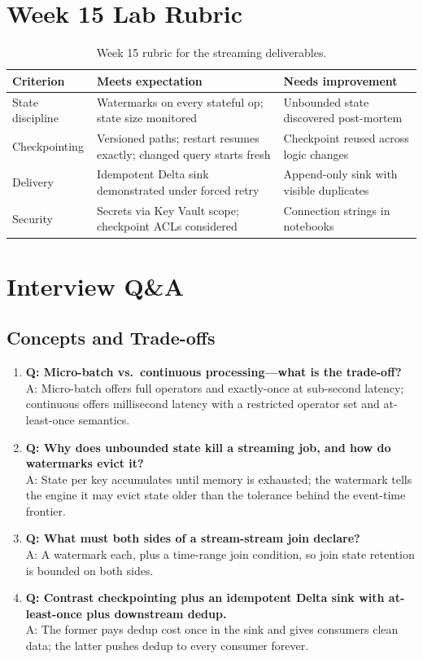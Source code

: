 \section{Week 15 Lab Rubric}
\begin{table}[H]
\centering
\small
\begin{tabular}{@{}p{3.2cm}p{5.0cm}p{5.0cm}@{}}
\toprule
\textbf{Criterion} & \textbf{Meets expectation} & \textbf{Needs improvement} \\
\midrule
State discipline & Watermarks on every stateful op; state size monitored & Unbounded state discovered post-mortem \\
Checkpointing & Versioned paths; restart resumes exactly; changed query starts fresh & Checkpoint reused across logic changes \\
Delivery & Idempotent Delta sink demonstrated under forced retry & Append-only sink with visible duplicates \\
Security & Secrets via Key Vault scope; checkpoint ACLs considered & Connection strings in notebooks \\
\bottomrule
\end{tabular}
\caption{Week 15 rubric for the streaming deliverables.}
\label{tab:ch15-rubric}
\end{table}

\section{Interview Q\&A}
\subsection{Concepts and Trade-offs}
\begin{enumerate}
    \item \textbf{Q: Micro-batch vs.\ continuous processing---what is the trade-off?}\\
    A: Micro-batch offers full operators and exactly-once at sub-second latency; continuous offers millisecond latency with a restricted operator set and at-least-once semantics.
    \item \textbf{Q: Why does unbounded state kill a streaming job, and how do watermarks evict it?}\\
    A: State per key accumulates until memory is exhausted; the watermark tells the engine it may evict state older than the tolerance behind the event-time frontier.
    \item \textbf{Q: What must both sides of a stream-stream join declare?}\\
    A: A watermark each, plus a time-range join condition, so join state retention is bounded on both sides.
    \item \textbf{Q: Contrast checkpointing plus an idempotent Delta sink with at-least-once plus downstream dedup.}\\
    A: The former pays dedup cost once in the sink and gives consumers clean data; the latter pushes dedup to every consumer forever.
\end{enumerate}

